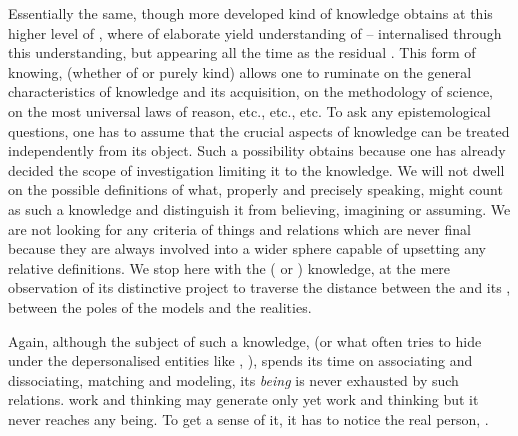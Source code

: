 \act Essentially the same, though more developed kind of knowledge obtains at
this higher level of , where  of elaborate
 yield understanding of  -- internalised through
this understanding, but appearing all the time as the residual
.  This  form of knowing, 
(whether of  or purely  kind) allows one to ruminate on
the general characteristics of knowledge and its acquisition, on the methodology
of science, on the most universal laws of reason, etc., etc., etc.  To ask any
epistemological questions, one has to assume that the crucial aspects of
knowledge can be treated independently from its object.  Such a possibility
obtains because one has already decided the scope of investigation limiting it
to the  knowledge.
We will not dwell on the possible definitions of what, properly and precisely
speaking, might count as such a knowledge and distinguish it from believing,
imagining or assuming. We are not looking for any criteria of  things and
relations which are never final because they are always involved into a wider
sphere capable of upsetting any relative definitions. We stop here with the
 ( or ) knowledge, at the mere
observation of its distinctive project to traverse the distance between the
 and its , between the  poles of the
 models and the  realities.

Again, although the subject of such a knowledge,  (or what often tries
to hide under the depersonalised entities like , ),
spends its time on associating and dissociating, matching and modeling, its
{\em being} is never exhausted by such relations.  work and
thinking may generate only yet  work and thinking but it never reaches
any being. To get a sense of it, it has to notice the real person, .

